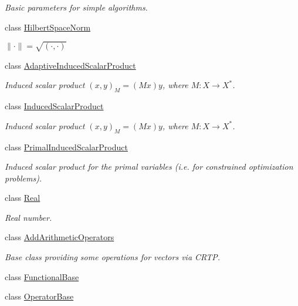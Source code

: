 \begin{DoxyCompactItemize}
\begin{DoxyCompactList}\small\item\em \-Basic parameters for simple algorithms. \end{DoxyCompactList}\item 
class \hyperlink{classSpacy_1_1HilbertSpaceNorm}{\-Hilbert\-Space\-Norm}
\begin{DoxyCompactList}\small\item\em $ \|\cdot\|=\sqrt{(\cdot,\cdot)} $ \end{DoxyCompactList}\item 
class \hyperlink{classSpacy_1_1AdaptiveInducedScalarProduct}{\-Adaptive\-Induced\-Scalar\-Product}
\begin{DoxyCompactList}\small\item\em \-Induced scalar product $(x,y)_M = (Mx)y$, where $M:X\rightarrow X^*$. \end{DoxyCompactList}\item 
class \hyperlink{classSpacy_1_1InducedScalarProduct}{\-Induced\-Scalar\-Product}
\begin{DoxyCompactList}\small\item\em \-Induced scalar product $(x,y)_M = (Mx)y$, where $M:X\rightarrow X^*$. \end{DoxyCompactList}\item 
class \hyperlink{classSpacy_1_1PrimalInducedScalarProduct}{\-Primal\-Induced\-Scalar\-Product}
\begin{DoxyCompactList}\small\item\em \-Induced scalar product for the primal variables (i.\-e. for constrained optimization problems). \end{DoxyCompactList}\item 
class \hyperlink{classSpacy_1_1Real}{\-Real}
\begin{DoxyCompactList}\small\item\em \-Real number. \end{DoxyCompactList}\item 
class \hyperlink{classSpacy_1_1AddArithmeticOperators}{\-Add\-Arithmetic\-Operators}
\begin{DoxyCompactList}\small\item\em \-Base class providing some operations for vectors via \-C\-R\-T\-P. \end{DoxyCompactList}\item 
class \hyperlink{classSpacy_1_1FunctionalBase}{\-Functional\-Base}
\item 
class \hyperlink{classSpacy_1_1OperatorBase}{\-Operator\-Base}

\end{DoxyCompactItemize}
